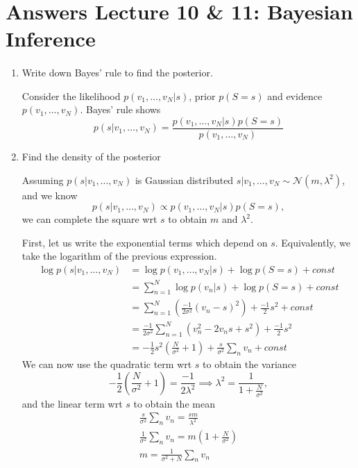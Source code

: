 \section{Answers Lecture 10 \& 11: Bayesian Inference}

\paragraph{} 

\begin{enumerate}[label=\alph*.]
\item Write down Bayes' rule to find the posterior.

Consider the likelihood $p(v_1, \dots, v_N | s)$, prior $p(S=s)$ and evidence $p(v_1, \dots, v_N)$. Bayes' rule shows
\begin{equation}
p(s|v_1, \dots, v_N) = \frac{p(v_1, \dots, v_N | s) p(S=s)}{p(v_1, \dots, v_N)}
\end{equation}

\item Find the density of the posterior

Assuming $p(s|v_1, \dots, v_N)$ is Gaussian distributed $s|v_1,\dots,v_N \sim \mathcal{N}(m, \lambda^2)$, and we know
\begin{equation}
p(s|v_1, \dots, v_N) \propto p(v_1, \dots, v_N | s) p(S=s),
\end{equation}
we can complete the square wrt $s$ to obtain $m$ and $\lambda^2$.

First, let us write the exponential terms which depend on $s$. Equivalently, we take the logarithm of the previous expression.
\begin{align*}
\log p(s|v_1, \dots, v_N) &= \log p(v_1, \dots, v_N | s) + \log p(S=s) + const\\
&=\sum_{n=1}^N\log p(v_n|s) + \log p(S=s) + const\\
&=\sum_{n=1}^N \left(\frac{-1}{2\sigma^2}(v_n - s)^2\right) + \frac{-1}{2}s^2 + const\\
&= \frac{-1}{2\sigma^2}\sum_{n=1}^N \left(v_n^2 - 2v_n s + s^2\right) + \frac{-1}{2}s^2\\
&= -\frac{1}{2}s^2\left(\frac{N}{\sigma^2} + 1 \right) + \frac{s}{\sigma^2}\sum_{n}v_n + const
\end{align*}
We can now use the quadratic term wrt $s$ to obtain the variance
\begin{equation}
-\frac{1}{2}\left(\frac{N}{\sigma^2} + 1 \right) = \frac{-1}{2\lambda^2} \implies \lambda^2 = \frac{1}{1 + \frac{N}{\sigma^2}},
\end{equation}
and the linear term wrt $s$ to obtain the mean
\begin{align*}
\frac{s}{\sigma^2}\sum_{n}v_n = \frac{sm}{\lambda^2}\\
\frac{1}{\sigma^2}\sum_{n}v_n= m\left(1 + \frac{N}{\sigma^2}\right)\\
m = \frac{1}{\sigma^2 + N}\sum_{n}v_n
\end{align*}


\end{enumerate}
